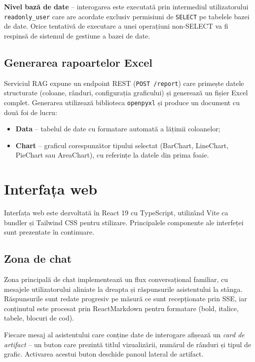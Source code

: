 \documentclass[12pt, a4paper]{report}
\newcommand{\code}[1]{\texttt{#1}}
\begin{document}
\textbf{Nivel bază de date} -- interogarea este executată prin intermediul utilizatorului \code{readonly\_user} care are acordate exclusiv permisiuni de \code{SELECT} pe tabelele bazei de date. Orice tentativă de executare a unei operațiuni non-SELECT va fi respinsă de sistemul de gestiune a bazei de date.

\subsection{Generarea rapoartelor Excel}

Serviciul RAG expune un endpoint REST (\code{POST /report}) care primește datele structurate (coloane, rânduri, configurația graficului) și generează un fișier Excel complet. Generarea utilizează biblioteca \code{openpyxl} și produce un document cu două foi de lucru:

\begin{itemize}[nosep]
  \item \textbf{Data} -- tabelul de date cu formatare automată a lățimii coloanelor;
  \item \textbf{Chart} -- graficul corespunzător tipului selectat (BarChart, LineChart, PieChart sau AreaChart), cu referințe la datele din prima foaie.
\end{itemize}

\section{Interfața web}

Interfața web este dezvoltată în React 19 cu TypeScript, utilizând Vite ca bundler și Tailwind CSS pentru stilizare. Principalele componente ale interfeței sunt prezentate în continuare.

\subsection{Zona de chat}

Zona principală de chat implementează un flux conversațional familiar, cu mesajele utilizatorului aliniate la dreapta și răspunsurile asistentului la stânga. Răspunsurile sunt redate progresiv pe măsură ce sunt recepționate prin SSE, iar conținutul este procesat prin ReactMarkdown pentru formatare (bold, italice, tabele, blocuri de cod).

Fiecare mesaj al asistentului care conține date de interogare afișează un \textit{card de artifact} -- un buton care prezintă titlul vizualizării, numărul de rânduri și tipul de grafic. Activarea acestui buton deschide panoul lateral de artifact.
\end{document}
